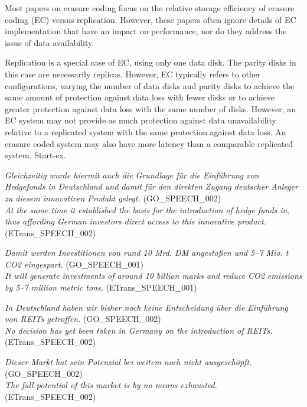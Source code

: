 \documentclass[11pt]{article}
\begin{document}
Most papers on erasure coding focus on the relative storage efficiency of erasure coding (EC) versus replication. However, these papers often ignore details of EC implementation that have an impact on performance, nor do they address the issue of data availability. 

Replication is a special case of EC, using only one data disk. The parity disks in this case are necessarily replicas. However, EC typically refers to other configurations, varying the number of data disks and parity disks to achieve the same amount of protection against data loss with fewer disks or to achieve greater protection against data loss with the same number of disks. However, an EC system may not provide as much protection against data unavailability relative to a replicated system with the same protection against data loss. An erasure coded system may also have more latency than a comparable replicated system. Start-ex.




\ea \label{ex:culo:29}
     \ea \textit{Gleichzeitig wurde hiermit auch die Grundlage für die Einführung von Hedgefonds in Deutschland und damit für den direkten Zugang deutscher Anleger zu diesem innovativen Produkt gelegt.} (GO\_SPEECH\_002)\\
      \ex \textit{At the same time it established the basis for the introduction of hedge funds in, thus affording German investors direct access to this innovative product.} (ETrans\_SPEECH\_002)
      \z
\z


\ea \label{ex:culo:30}
   \ea \textit{Damit werden Investitionen von rund 10 Mrd. DM angestoßen und 5--7 Mio. t CO2 eingespart.} (GO\_SPEECH\_001)\\
      \ex \textit{It will generate investments of around 10 billion marks and reduce CO2 emissions by 5--7 million metric tons.} (ETrans\_SPEECH\_001) 
      \z
\z


\ea \label{ex:culo:31}
    \ea \textit{In Deutschland haben wir bisher noch keine Entscheidung über die Einführung von REITs getroffen. }(GO\_SPEECH\_002)\\
    \ex \textit{No decision has yet been taken in Germany on the introduction of REITs.} (ETrans\_SPEECH\_002) 
    \z
\z


\ea \label{ex:culo:32}
    \ea \textit{Dieser Markt hat sein Potenzial bei weitem noch nicht ausgeschöpft.} (GO\_SPEECH\_002)\\
     \ex \textit{The full potential of this market is by no means exhausted.} (ETrans\_SPEECH\_002)
     \z
\z
\end{document}
